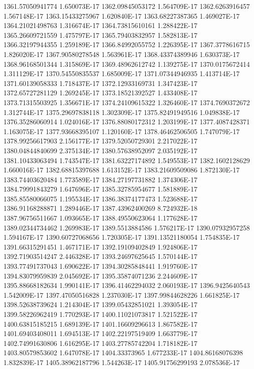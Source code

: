1361.57050941774  1.650073E-17
1362.09845053172  1.564709E-17
1362.6263916457  1.567148E-17
1363.15433275967  1.620840E-17
1363.68227387365  1.469027E-17
1364.21021498763  1.316674E-17
1364.73815610161  1.288422E-17
1365.26609721559  1.475797E-17
1365.79403832957  1.582813E-17
1366.32197944355  1.259189E-17
1366.84992055752  1.226395E-17
1367.3778616715  1.826020E-17
1367.90580278548  1.563961E-17
1368.43374389946  1.630373E-17
1368.96168501344  1.315869E-17
1369.48962612742  1.139275E-17
1370.0175672414  1.311129E-17
1370.54550835537  1.685009E-17
1371.07344946935  1.413714E-17
1371.60139058333  1.718437E-17
1372.12933169731  1.347423E-17
1372.65727281129  1.269245E-17
1373.18521392527  1.433408E-17
1373.71315503925  1.356671E-17
1374.24109615322  1.326460E-17
1374.7690372672  1.312744E-17
1375.29697838118  1.302309E-17
1375.82491949516  1.049838E-17
1376.35286060914  1.024016E-17
1376.88080172312  1.203199E-17
1377.4087428371  1.163075E-17
1377.93668395107  1.120160E-17
1378.46462506505  1.747079E-17
1378.99256617903  2.156177E-17
1379.52050729301  2.217022E-17
1380.04844840699  2.375134E-17
1380.57638952097  2.035192E-17
1381.10433063494  1.743547E-17
1381.63227174892  1.549553E-17
1382.1602128629  1.660016E-17
1382.68815397688  1.613152E-17
1383.21609509086  1.872130E-17
1383.74403620484  1.773589E-17
1384.27197731882  1.374306E-17
1384.79991843279  1.647696E-17
1385.32785954677  1.581889E-17
1385.85580066075  1.195534E-17
1386.38374177473  1.523688E-17
1386.91168288871  1.289446E-17
1387.43962400269  8.724932E-18
1387.96756511667  1.093665E-17
1388.49550623064  1.177628E-17
1389.02344734462  1.269983E-17
1389.5513884586  1.576217E-17
1390.07932957258  1.594167E-17
1390.60727068656  1.720305E-17
1391.13521180054  1.754835E-17
1391.66315291451  1.467171E-17
1392.19109402849  1.924806E-17
1392.71903514247  2.446328E-17
1393.24697625645  1.570144E-17
1393.77491737043  1.690622E-17
1394.30285848441  1.919760E-17
1394.83079959839  2.045692E-17
1395.35874071236  2.244609E-17
1395.88668182634  1.990141E-17
1396.41462294032  2.060193E-17
1396.9425640543  1.542009E-17
1397.47050516828  1.237030E-17
1397.99844628226  1.661825E-17
1398.52638739624  1.214304E-17
1399.05432851021  1.393054E-17
1399.58226962419  1.770293E-17
1400.11021073817  1.521522E-17
1400.63815185215  1.689139E-17
1401.16609296613  1.867582E-17
1401.69403408011  1.694513E-17
1402.22197519409  1.663779E-17
1402.74991630806  1.616295E-17
1403.27785742204  1.718182E-17
1403.80579853602  1.647078E-17
1404.33373965  1.677233E-17
1404.86168076398  1.832839E-17
1405.38962187796  1.544263E-17
1405.91756299193  2.078536E-17
